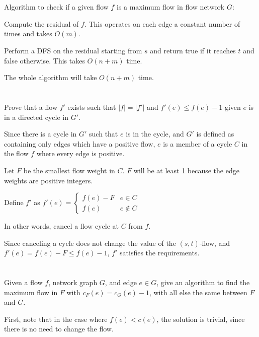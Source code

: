 \documentclass{article}
\begin{document}
\section{}

Algorithm to check if a given flow $f$ is a maximum flow in flow network $G$:

Compute the residual of $f$. This operates on each edge a constant number of
times and takes $O(m)$.

Perform a DFS on the residual starting from $s$ and return true if it
reaches $t$ and false otherwise. This takes $O(n + m)$ time.

The whole algorithm will take $O(n+m)$ time.

\section{}

Prove that a flow $f'$ exists such that $|f| = |f'|$ and $f'(e) \leq f(e) - 1$
given $e$ is in a directed cycle in $G'$.

Since there is a cycle in $G'$ such that $e$ is in the cycle, and $G'$ is
defined as containing only edges which have a positive flow, $e$ is a member
of a cycle $C$ in the flow $f$ where every edge is positive.

Let $F$ be the smallest flow weight in $C$. $F$ will be at least 1 because the
edge weights are positive integers.

Define $f'$ as $f'(e) = 
\begin{cases}
    f(e) - F & e \in C \\
    f(e)     & e \notin C
\end{cases}$

In other words, cancel a flow cycle at $C$ from $f$.

Since canceling a cycle does not change the value of the $(s,t)$-flow, and
$f'(e) = f(e) - F \leq f(e) - 1$, $f'$ satisfies the requirements.

\section{}

Given a flow $f$, network graph $G$, and edge $e \in G$, give an algorithm to
find the maximum flow in $F$ with $c_F(e) = c_G(e) - 1$, with all else the
same between $F$ and $G$.

First, note that in the case where $f(e) < c(e)$, the solution is trivial,
since there is no need to change the flow.
\end{document}
